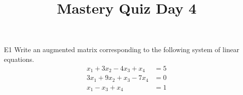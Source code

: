 \documentclass{sbgLAquiz}
\title{Mastery Quiz Day 4 }
\begin{document}
\begin{problem}{E1}
Write an augmented matrix corresponding to the following system of linear equations.
\begin{align*}
x_1+3x_2-4x_3 +x_4 &= 5 \\
3x_1+9x_2+x_3-7x_4 &= 0 \\
x_1-x_3 +x_4 &= 1
\end{align*}
\end{problem}
\end{document}

